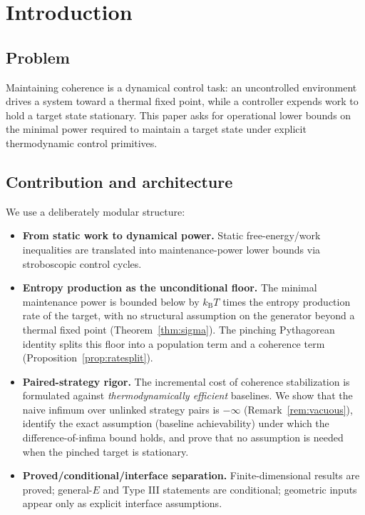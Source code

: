 \documentclass[11pt,a4paper]{article}
\theoremstyle{plain}
\theoremstyle{definition}
\theoremstyle{remark}
\newcommand{\kB}{k_{\mathrm{B}}}
\begin{document}
\tableofcontents

\section{Introduction}

\subsection{Problem}

Maintaining coherence is a dynamical control task: an uncontrolled environment
drives a system toward a thermal fixed point, while a controller expends work to
hold a target state stationary. This paper asks for operational lower bounds on
the minimal power required to maintain a target state under explicit
thermodynamic control primitives.

\subsection{Contribution and architecture}

We use a deliberately modular structure:

\begin{itemize}
\item[(C1)] \textbf{From static work to dynamical power.} Static
free-energy/work inequalities are translated into maintenance-power lower
bounds via stroboscopic control cycles.
\item[(C2)] \textbf{Entropy production as the unconditional floor.} The minimal
maintenance power is bounded below by $\kB T$ times the entropy production rate
of the target, with no structural assumption on the generator beyond a thermal
fixed point (Theorem~\ref{thm:sigma}). The pinching Pythagorean identity splits
this floor into a population term and a coherence term
(Proposition~\ref{prop:ratesplit}).
\item[(C3)] \textbf{Paired-strategy rigor.} The incremental cost of coherence
stabilization is formulated against \emph{thermodynamically efficient}
baselines. We show that the naive infimum over unlinked strategy pairs is
$-\infty$ (Remark~\ref{rem:vacuous}), identify the exact assumption
(baseline achievability) under which the difference-of-infima bound holds, and
prove that no assumption is needed when the pinched target is stationary.
\item[(C4)] \textbf{Proved/conditional/interface separation.}
Finite-dimensional results are proved; general-$E$ and Type III statements are
conditional; geometric inputs appear only as explicit interface assumptions.
\end{itemize}
\end{document}
